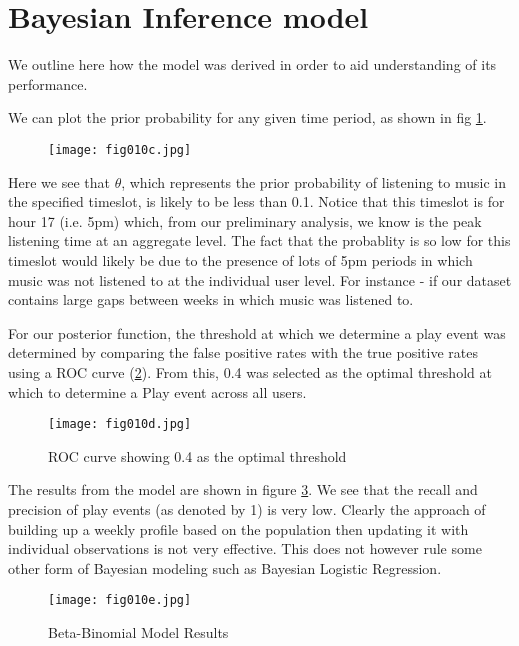 \section{Bayesian Inference model}

We outline here how the model was derived in order to aid understanding of its performance. 

We can plot the prior probability for any given time period, as shown in fig \ref{fig10c}.

\begin{figure}[h!]
	\centering
	\texttt{[image: fig010c.jpg]}
	\caption{}
	\label{fig10c}
\end{figure} 

Here we see that $\theta$, which represents the prior probability of listening to music in the specified timeslot, is likely to be less than 0.1. Notice that this timeslot is for hour 17 (i.e. 5pm) which, from our preliminary analysis, we  know is the peak listening time at an aggregate level. The fact that the probablity is so low for this timeslot would likely be due to the presence of lots of 5pm periods in which music was not listened to at the individual user level. For instance - if our dataset contains large gaps between weeks in which music was listened to. 

For our posterior function, the threshold at which we determine a play event was determined by comparing the false positive rates with the true positive rates using a ROC curve (\ref{fig10d}). From this, 0.4 was selected as the optimal threshold at which to determine a Play event across all users.

\begin{figure}[h!]
	\centering
	\texttt{[image: fig010d.jpg]}
	\caption{ROC curve showing 0.4 as the optimal threshold}
	\label{fig10d}
\end{figure} 

The results from the model are shown in figure \ref{fig10e}. We see that the recall and precision of play events (as denoted by 1) is very low. Clearly the approach of building up a weekly profile based on the population then updating it with individual observations is not very effective. This does not however rule some other form of Bayesian modeling such as Bayesian Logistic Regression.

\begin{figure}[h!]
	\centering
	\texttt{[image: fig010e.jpg]}
	\caption{Beta-Binomial Model Results}
	\label{fig10e}
\end{figure} 

